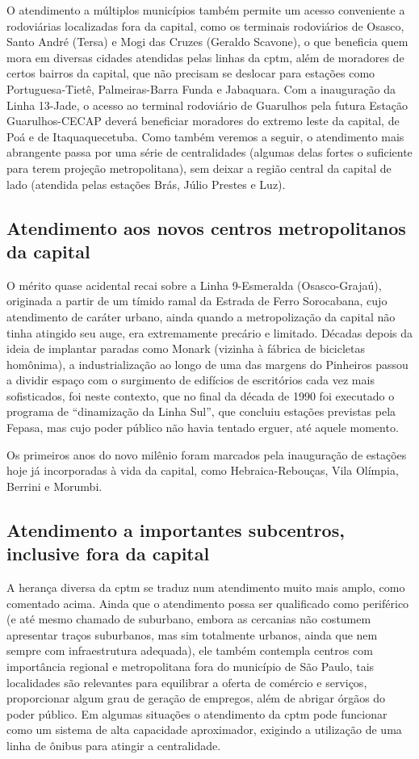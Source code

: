 \documentclass[11pt,fleqn]{book} %
\begin{document}
O atendimento a múltiplos municípios também permite um acesso conveniente a rodoviárias localizadas fora da capital, como os terminais rodoviários de Osasco, Santo André (Tersa) e Mogi das Cruzes (Geraldo Scavone), o que beneficia quem mora em diversas cidades atendidas pelas linhas da \gls{cptm}, além de moradores de certos bairros da capital, que não precisam se deslocar para estações como Portuguesa-Tietê, Palmeiras-Barra Funda e Jabaquara. Com a inauguração da Linha 13-Jade, o acesso ao terminal rodoviário de Guarulhos pela futura Estação Guarulhos-CECAP deverá beneficiar moradores do extremo leste da capital, de Poá e de Itaquaquecetuba. Como também veremos a seguir, o atendimento mais abrangente passa por uma série de centralidades (algumas delas fortes o suficiente para terem projeção metropolitana), sem deixar a região central da capital de lado (atendida pelas estações Brás, Júlio Prestes e Luz).

\subsection{Atendimento aos novos centros metropolitanos da capital}

O mérito quase acidental recai sobre a Linha 9-Esmeralda (Osasco-Grajaú), originada a partir de um tímido ramal da Estrada de Ferro Sorocabana, cujo atendimento de caráter urbano, ainda quando a metropolização da capital não tinha atingido seu auge, era extremamente precário e limitado. Décadas depois da ideia de implantar paradas como Monark (vizinha à fábrica de bicicletas homônima), a industrialização ao longo de uma das margens do Pinheiros passou a dividir espaço com o surgimento de edifícios de escritórios cada vez mais sofisticados, foi neste contexto, que no final da década de 1990 foi executado o programa de “dinamização da Linha Sul”, que concluiu estações previstas pela Fepasa, mas cujo poder público não havia tentado erguer, até aquele momento.

Os primeiros anos do novo milênio foram marcados pela inauguração de estações hoje já incorporadas à vida da capital, como Hebraica-Rebouças, Vila Olímpia, Berrini e Morumbi.

\subsection{Atendimento a importantes subcentros, inclusive fora da capital}

A herança diversa da \gls{cptm} se traduz num atendimento muito mais amplo, como comentado acima. Ainda que o atendimento possa ser qualificado como periférico (e até mesmo chamado de suburbano, embora as cercanias não costumem apresentar traços suburbanos, mas sim totalmente urbanos, ainda que nem sempre com infraestrutura adequada), ele também contempla centros com importância regional e metropolitana fora do município de São Paulo, tais localidades são relevantes para equilibrar a oferta de comércio e serviços, proporcionar algum grau de geração de empregos, além de abrigar órgãos do poder público. Em algumas situações o atendimento da \gls{cptm} pode funcionar como um sistema de alta capacidade aproximador, exigindo a utilização de uma linha de ônibus para atingir a centralidade.
\end{document}
